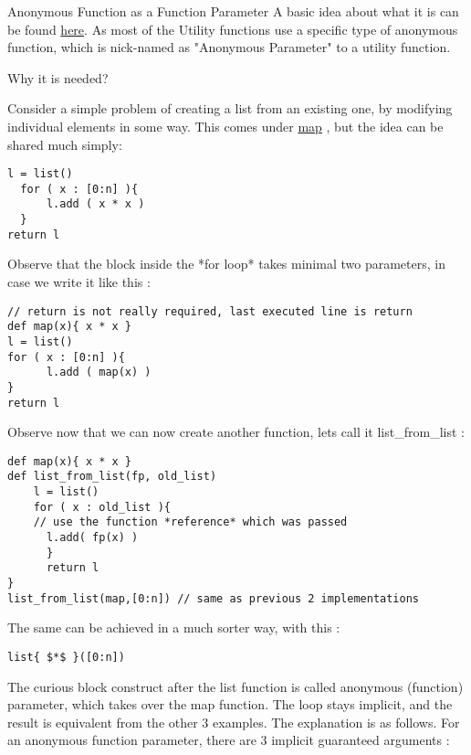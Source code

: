 \begin{section}{Anonymous Function as a Function Parameter}
A basic idea about what it is can be found \href{https://en.wikipedia.org/wiki/Anonymous\_function}{here}.
As most of the Utility functions use a specific type of anonymous function, 
which is nick-named as "Anonymous Parameter" to a utility function.

\begin{subsection}{Why it is needed?}

Consider a simple problem of creating a list from an existing one, 
by modifying individual elements in some way. This comes under 
\href{https://en.wikipedia.org/wiki/Map\_(higher-order\_function)}{map} , but the idea can be shared much simply:

\begin{lstlisting}[style=JexlStyle]
l = list()
  for ( x : [0:n] ){
      l.add ( x * x ) 
  }
return l 
\end{lstlisting}
Observe that the block inside the *for loop* takes minimal two parameters, 
in case we write it like this :
\begin{lstlisting}[style=JexlStyle]
// return is not really required, last executed line is return 
def map(x){ x * x } 
l = list()
for ( x : [0:n] ){
      l.add ( map(x) ) 
}
return l 
\end{lstlisting}

Observe now that we can now create another function, lets call it list\_from\_list :

\begin{lstlisting}[style=JexlStyle]
def map(x){ x * x } 
def list_from_list(fp, old_list)
    l = list()
    for ( x : old_list ){
    // use the function *reference* which was passed
      l.add( fp(x) )   
      }
      return l
} 
list_from_list(map,[0:n]) // same as previous 2 implementations
\end{lstlisting}
The same can be achieved in a much sorter way, with this :
\begin{lstlisting}[style=JexlStyle]
list{ $*$ }([0:n])
\end{lstlisting}

The curious block construct after the list function is called anonymous (function) parameter, 
which takes over the map function. The loop stays implicit, and the result is equivalent 
from the other 3 examples. The explanation is as follows.
For an anonymous function parameter, there are 3 implicit guaranteed arguments :


\end{subsection}
\end{section}
